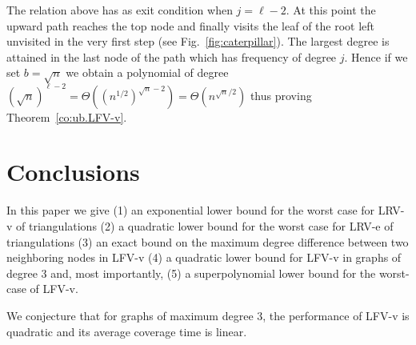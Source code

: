 The relation above has as exit condition when $j=\ell-2$. At this point the upward path reaches the top node and finally visits the leaf of the root
left unvisited in the very first step (see Fig.~\ref{fig:caterpillar}). The largest degree is attained in the last node of the path which has frequency of degree $j$.
Hence if we set $b=\sqrt{n}$ we obtain a polynomial of degree $\left(\sqrt{n}\right)^{\ell-2}=\Theta((n^{1/2})^{\sqrt{n}-2})=\Theta(n^{\sqrt{n}/2})$
thus proving Theorem~\ref{co:ub.LFV-v}.

\section{Conclusions}
In this paper we give (1) an exponential lower bound for the
worst case for LRV-v of triangulations (2) a quadratic lower bound for
the worst case for LRV-e of triangulations (3) an exact bound on the maximum degree
difference between two neighboring nodes in LFV-v (4) a quadratic lower bound for LFV-v
in graphs of degree 3 and, most importantly, (5) a superpolynomial lower bound for the
worst-case of LFV-v.

We conjecture that for graphs of maximum degree 3, the performance of LFV-v is quadratic
and its average coverage time is linear.









